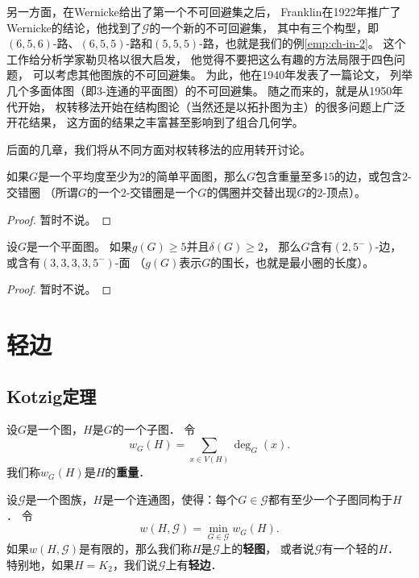 \documentclass[cn,fancy,blue,11pt]{elegantbook}
\begin{document}
另一方面，在Wernicke给出了第一个不可回避集之后，
Franklin在1922年推广了Wernicke的结论，他找到了$\mathcal{G}$的一个新的不可回避集，
其中有三个构型，即$(6,5,6)$-路、$(6,5,5)$-路和$(5,5,5)$-路，也就是我们的例\ref{emp:ch-in-2}。
这个工作给分析学家勒贝格以很大启发，
他觉得不要把这么有趣的方法局限于四色问题，
可以考虑其他图族的不可回避集。
为此，他在1940年发表了一篇论文，
列举几个多面体图（即3-连通的平面图）的不可回避集。
随之而来的，就是从1950年代开始，
权转移法开始在结构图论（当然还是以拓扑图为主）的很多问题上广泛开花结果，
这方面的结果之丰富甚至影响到了组合几何学。

后面的几章，我们将从不同方面对权转移法的应用转开讨论。

\begin{exercise}
	如果$G$是一个平均度至少为$2$的简单平面图，那么$G$包含重量至多$15$的边，或包含$2$-交错圈
	（所谓$G$的一个$2$-交错圈是一个$G$的偶圈并交替出现$G$的$2$-顶点）。
\end{exercise}

\begin{proof}
	暂时不说。
\end{proof}

\begin{exercise}
	设$G$是一个平面图。
	如果$g(G)\ge5$并且$\delta(G)\ge2$，
	那么$G$含有$(2,5^-)$-边，或含有$(3,3,3,3,5^-)$-面
	（$g(G)$表示$G$的围长，也就是最小圈的长度）。
\end{exercise}

\begin{proof}
	暂时不说。
\end{proof}


\chapter{轻边}


\section{Kotzig定理}

设$G$是一个图，$H$是$G$的一个子图．
令
\[w_G(H)=\sum_{x\in V(H)}\deg_G(x).\]
我们称$w_G(H)$是$H$的\textbf{重量}．

设$\mathcal{G}$是一个图族，$H$是一个连通图，使得：每个$G\in\mathcal{G}$都有至少一个子图同构于$H$．
令
\[w(H,\mathcal{G})=\min_{G\in \mathcal{G}}w_G(H).\]
如果$w(H,\mathcal{G})$是有限的，那么我们称$H$是$\mathcal{G}$上的\textbf{轻图}，
或者说$\mathcal{G}$有一个轻的$H$．
特别地，如果$H=K_2$，我们说$\mathcal{G}$上有\textbf{轻边}．
\end{document}
